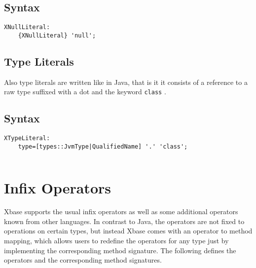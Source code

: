 \documentclass[a4paper,10pt]{scrreprt}
\begin{document}
\subsection{Syntax}

\begin{lstlisting}
XNullLiteral:
	{XNullLiteral} 'null';

\end{lstlisting}





\subsection{Type Literals}
\label{TypeLiteral}
Also type literals are written like in Java, that is it it consists of a reference to a raw type suffixed with a dot and the keyword \lstinline{class}
.




\subsection{Syntax}

\begin{lstlisting}
XTypeLiteral:
	type=[types::JvmType|QualifiedName] '.' 'class';
 
\end{lstlisting}







\section{Infix Operators}
\label{Operators}
Xbase supports the usual infix operators as well as some additional operators known from other languages. In contrast to Java, the operators are not fixed
to operations on certain types, but instead Xbase comes with an operator to method mapping, which allows users to redefine the operators for any type just by implementing
the corresponding method signature. The following defines the operators and the corresponding method signatures.
\end{document}
